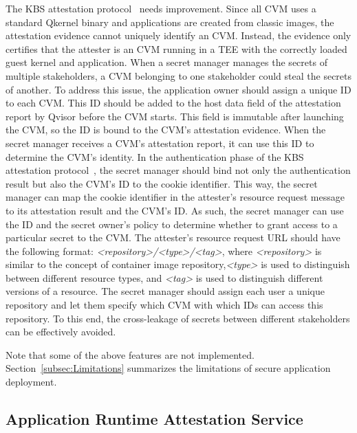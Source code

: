 \label{eq:1}The KBS attestation protocol~\cite*{kbs_Attestation_protocol} needs improvement. Since all \acrshort{CVM} uses a standard Qkernel binary and applications are created from classic images, the attestation evidence cannot uniquely identify an \acrshort{CVM}. Instead, the evidence only certifies that the attester is an \acrshort{CVM} running in a TEE with the correctly 
loaded guest kernel and application. When a secret manager manages the secrets of multiple stakeholders, a \acrshort{CVM} belonging to one stakeholder could steal the secrets of another. To address this issue, the application owner should assign a unique ID to each CVM. This ID should be added to the host data field of the attestation report by Qvisor before 
the \acrshort{CVM} starts. This field is immutable after launching the \acrshort{CVM}, so the ID is bound to the \acrshort{CVM}'s attestation evidence. When the secret manager receives a \acrshort{CVM}'s attestation report, it can use this ID to determine the \acrshort{CVM}'s identity. In the authentication phase of the KBS attestation 
protocol~\cite*{kbs_Attestation_protocol}, the secret manager should bind not only the authentication result but also the \acrshort{CVM}'s ID to the cookie identifier. This way, the secret manager can map the cookie identifier in the attester's resource request message to its attestation result and the \acrshort{CVM}'s ID. As such, the secret manager can use the 
ID and the secret owner's policy to determine whether to grant access to a particular secret to the \acrshort{CVM}. The attester's resource request URL should have the following format: \emph{<repository>/<type>/<tag>}, where \emph{<repository>} is similar to the concept of container image repository,\emph{<type>} is used to distinguish between different resource 
types, and \emph{<tag>} is used to distinguish different versions of a resource. The secret manager should assign each user a unique repository and let them specify which \acrshort{CVM} with which IDs can access this repository. To this end, the cross-leakage of secrets between different stakeholders can be effectively avoided. 


Note that some of the above features are not implemented. Section~\ref{subsec:Limitations} summarizes the limitations of secure application deployment.

\subsection{Application Runtime Attestation Service}
\label{sec:runtime_attesation}

